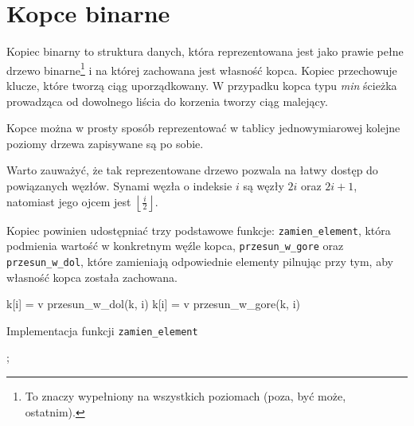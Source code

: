 \section{Kopce binarne}

Kopiec binarny to struktura danych, która reprezentowana jest jako prawie pełne drzewo binarne\footnote{To znaczy wypełniony na wszystkich poziomach (poza, być może, ostatnim).} i na której zachowana jest własność kopca. Kopiec przechowuje klucze, które tworzą ciąg uporządkowany. W przypadku kopca typu \emph{min} ścieżka prowadząca od dowolnego liścia do korzenia tworzy ciąg malejący.

Kopce można w prosty sposób reprezentować w tablicy jednowymiarowej \textendash kolejne poziomy drzewa zapisywane są po sobie.


Warto zauważyć, że tak reprezentowane drzewo pozwala na łatwy dostęp do powiązanych węzłów. Synami węzła o indeksie $i$ są węzły $2i$ oraz $2i + 1$, natomiast jego ojcem jest $\left\lfloor \frac{i}{2} \right\rfloor$.

Kopiec powinien udostępniać trzy podstawowe funkcje: \texttt{zamien\_element}, która podmienia wartość w konkretnym węźle kopca, \texttt{przesun\_w\_gore} oraz \texttt{przesun\_w\_dol}, które zamieniają odpowiednie elementy pilnując przy tym, aby własność kopca została zachowana.


\begin{algorithm}[h]
  {
    k[i] = v\;
	przesun\_w\_dol(k, i)\;
  }
  \Else
  {
    k[i] = v\;
	przesun\_w\_gore(k, i)\;
  }  
  \caption{Implementacja funkcji \texttt{zamien\_element}}
  \label{kopiec-zamien-element}
\end{algorithm};